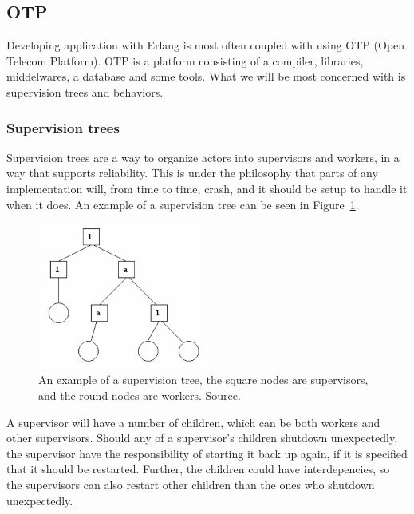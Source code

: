 \documentclass[a4paper]{article}
\newcommand\figref[1]{Figure~\ref{#1}}
\begin{document}
\subsection{OTP}
Developing application with Erlang is most often coupled with using OTP (Open
Telecom Platform). OTP is a platform consisting of a compiler, libraries,
middelwares, a database and some tools\cite{ErlangOTPDocs}. What we will be most
concerned with is supervision trees and behaviors.

\subsubsection{Supervision trees}
Supervision trees are a way to organize actors into supervisors and workers, in
a way that supports reliability. This is under the philosophy that parts of any
implementation will, from time to time, crash, and it should be setup to handle
it when it does. An example of a supervision tree can be seen in
\figref{fig:supervision_tree}.

\begin{figure}[h]
  \centering
  \includegraphics[width=0.5\textwidth]{./resources/SupervisionTree.png}
  \caption{An example of a supervision tree, the square nodes are supervisors,
    and the round nodes are workers.
    \href{https://erlang.org/doc/design_principles/des_princ.html}{Source}.}
  \label{fig:supervision_tree}
\end{figure}

\noindent
A supervisor will have a number of children, which can be both workers and other
supervisors. Should any of a supervisor's children shutdown unexpectedly, the
supervisor have the responsibility of starting it back up again, if it is
specified that it should be restarted. Further, the children could have
interdepencies, so the supervisors can also restart other children than the ones
who shutdown unexpectedly.
\end{document}
